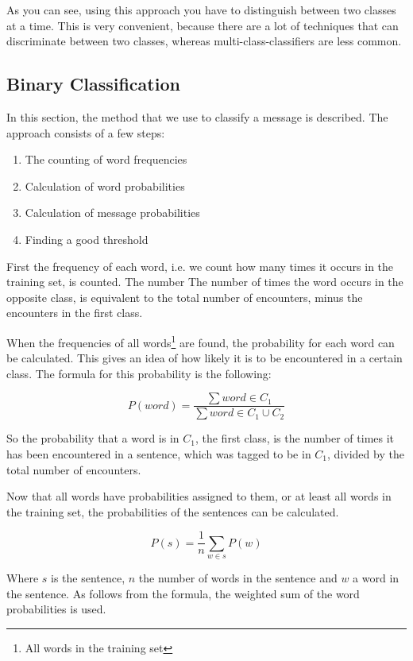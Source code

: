 \documentclass[11pt]{article}
\begin{document}
As you can see, using this approach you have to distinguish between two classes at a time. This is very convenient, because there are a lot of techniques that can discriminate between two classes, whereas multi-class-classifiers are less common.

\subsection{Binary Classification}
In this section, the method that we use to classify a message is described. The approach consists of a few steps:
\begin{enumerate}
\item The counting of word frequencies
\item Calculation of word probabilities
\item Calculation of message probabilities
\item Finding a good threshold
\end{enumerate}

First the frequency of each word, i.e. we count how many times it occurs in the training set, is counted. The number  The number of times the word occurs in the opposite class, is equivalent to the total number of encounters, minus the encounters in the first class.

When the frequencies of all words\footnote{All words in the training set} are found, the probability for each word can be calculated. This gives an idea of how likely it is to be encountered in a certain class. The formula for this probability is the following:

\begin{equation}
P(word) = \frac{ \sum word \in C_1}{\sum word \in C_1\cup C_2}
\end{equation}

So the probability that a word is in $C_1$, the first class, is the number of times it has been encountered in a sentence, which was tagged to be in $C_1$, divided by the total number of encounters.

Now that all words have probabilities assigned to them, or at least all words in the training set, the probabilities of the sentences can be calculated.

\begin{equation}
P(s) = \frac{1}{n} \sum_{w \in s} P(w)
\end{equation}

Where $s$ is the sentence, $n$ the number of words in the sentence and $w$ a word in the sentence. As follows from the formula,  the weighted sum of the word probabilities is used.
\end{document}
